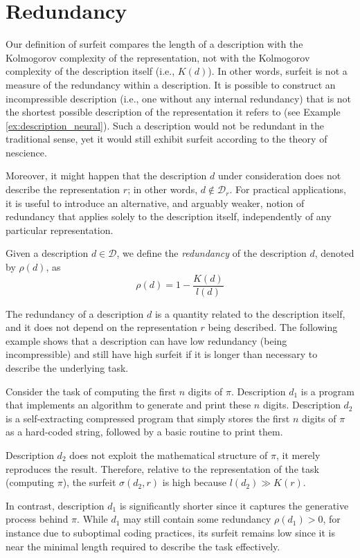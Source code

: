%
%

\section{Redundancy}
\label{sec:Definition_redundancy}

Our definition of surfeit compares the length of a description with the Kolmogorov complexity of the representation, not with the Kolmogorov complexity of the description itself (i.e., $K(d)$). In other words, surfeit is not a measure of the redundancy within a description. It is possible to construct an incompressible description (i.e., one without any internal redundancy) that is not the shortest possible description of the representation it refers to (see Example \ref{ex:description_neural}). Such a description would not be redundant in the traditional sense, yet it would still exhibit surfeit according to the theory of nescience.

Moreover, it might happen that the description $d$ under consideration does not describe the representation $r$; in other words, $d \notin \mathcal{D}_r$. For practical applications, it is useful to introduce an alternative, and arguably weaker, notion of redundancy that applies solely to the description itself, independently of any particular representation.

\begin{definition}[Redundancy]
Given a description $d \in \mathcal{D}$, we define the \emph{redundancy} of the description $d$, denoted by $\rho(d)$, as
\[
\rho(d) = 1 - \frac{K(d)}{l(d)}
\]
\end{definition}

The redundancy of a description $d$ is a quantity related to the description itself, and it does not depend on the representation $r$ being described. The following example shows that a description can have low redundancy (being incompressible) and still have high surfeit if it is longer than necessary to describe the underlying task.

\begin{example}
Consider the task of computing the first $n$ digits of $\pi$. Description $d_1$ is a program that implements an algorithm to generate and print these $n$ digits. Description $d_2$ is a self-extracting compressed program that simply stores the first $n$ digits of $\pi$ as a hard-coded string, followed by a basic routine to print them. 

Description $d_2$ does not exploit the mathematical structure of $\pi$, it merely reproduces the result. Therefore, relative to the representation of the task (computing $\pi$), the surfeit \( \sigma(d_2, r) \) is high because \( l(d_2) \gg K(r) \). 

In contrast, description $d_1$ is significantly shorter since it captures the generative process behind $\pi$. While $d_1$ may still contain some redundancy \( \rho(d_1) > 0 \), for instance due to suboptimal coding practices, its surfeit remains low since it is near the minimal length required to describe the task effectively.
\end{example}

